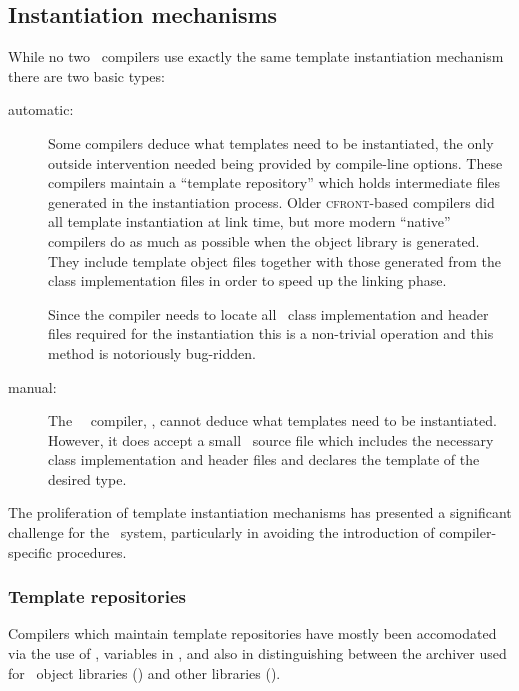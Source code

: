 \subsection*{Instantiation mechanisms}

While no two \cplusplus\ compilers use exactly the same template instantiation
mechanism there are two basic types:

\begin{description}
\item[automatic:]
   Some compilers deduce what templates need to be instantiated, the only
   outside intervention needed being provided by compile-line options.  These
   compilers maintain a ``template repository'' which holds intermediate files
   generated in the instantiation process.  Older \textsc{cfront}-based
   compilers did all template instantiation at link time, but more modern
   ``native'' compilers do as much as possible when the object library is
   generated.  They include template object files together with those
   generated from the class implementation files in order to speed up the
   linking phase.

   Since the compiler needs to locate all \cplusplus\ class implementation and
   header files required for the instantiation this is a non-trivial operation
   and this method is notoriously bug-ridden.

\item[manual:]
   The \gnu\ \cplusplus\ compiler, , cannot deduce what templates
   need to be instantiated.  However, it does accept a small \cplusplus\ source
   file which includes the necessary class implementation and header files and
   declares the template of the desired type.
\end{description}

The proliferation of template instantiation mechanisms has presented a
significant challenge for the \aipspp\ system, particularly in avoiding the
introduction of compiler-specific procedures.

\subsubsection*{Template repositories}

Compilers which maintain template repositories have mostly been accomodated
via the use of ,  variables in ,
and also in distinguishing between the archiver used for \cplusplus\ object
libraries () and other libraries ().

